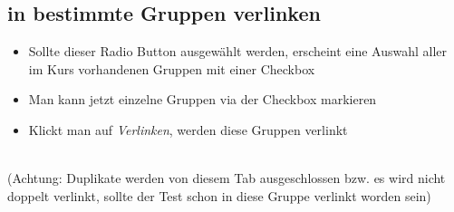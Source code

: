 \subsection*{in bestimmte Gruppen verlinken}
\begin{itemize}
	\item Sollte dieser Radio Button ausgewählt werden, erscheint eine Auswahl aller im Kurs vorhandenen Gruppen mit einer Checkbox
	\item Man kann jetzt einzelne Gruppen via der Checkbox markieren
	\item Klickt man auf \textit{Verlinken}, werden diese Gruppen verlinkt
\end{itemize}

~\\(Achtung: Duplikate werden von diesem Tab ausgeschlossen bzw. es wird nicht doppelt verlinkt, sollte der Test schon in diese Gruppe verlinkt worden sein) 
\clearpage